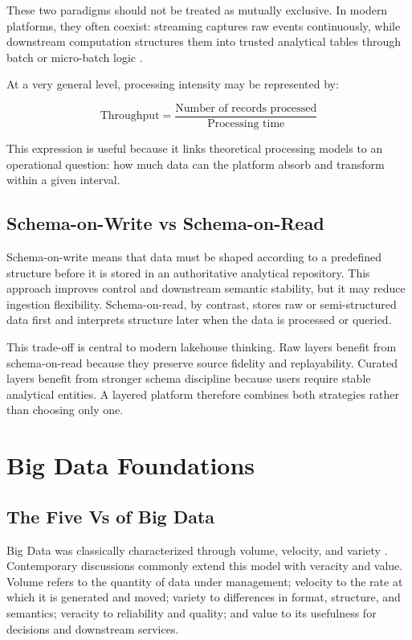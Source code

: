 These two paradigms should not be treated as mutually exclusive. In modern platforms, they often coexist: streaming captures raw events continuously, while downstream computation structures them into trusted analytical tables through batch or micro-batch logic \cite{marz2015bigdata,kreps2014questioning}.

At a very general level, processing intensity may be represented by:

\[
\text{Throughput} = \frac{\text{Number of records processed}}{\text{Processing time}}
\]

This expression is useful because it links theoretical processing models to an operational question: how much data can the platform absorb and transform within a given interval.

\subsection{Schema-on-Write vs Schema-on-Read}
Schema-on-write means that data must be shaped according to a predefined structure before it is stored in an authoritative analytical repository. This approach improves control and downstream semantic stability, but it may reduce ingestion flexibility. Schema-on-read, by contrast, stores raw or semi-structured data first and interprets structure later when the data is processed or queried.

This trade-off is central to modern lakehouse thinking. Raw layers benefit from schema-on-read because they preserve source fidelity and replayability. Curated layers benefit from stronger schema discipline because users require stable analytical entities. A layered platform therefore combines both strategies rather than choosing only one.

\section{Big Data Foundations}

\subsection{The Five Vs of Big Data}
Big Data was classically characterized through volume, velocity, and variety \cite{laney2001three}. Contemporary discussions commonly extend this model with veracity and value. Volume refers to the quantity of data under management; velocity to the rate at which it is generated and moved; variety to differences in format, structure, and semantics; veracity to reliability and quality; and value to its usefulness for decisions and downstream services.

